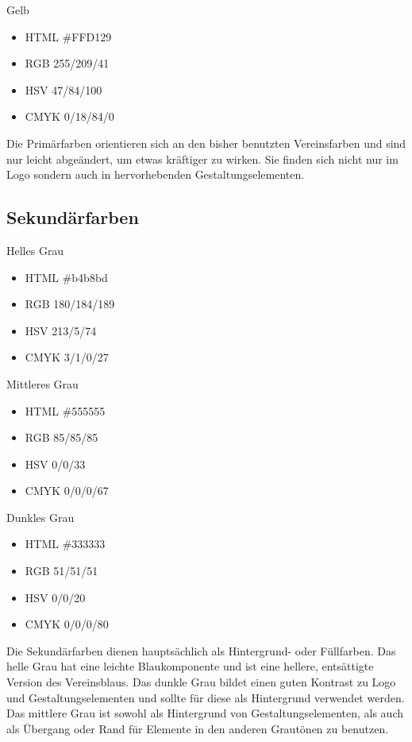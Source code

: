 \documentclass{article}
\begin{document}
\begin{samepage}
\cfield[LESYellow]
Gelb
\begin{itemize}
\item HTML \#FFD129
\item RGB 255/209/41
\item HSV 47/84/100
\item CMYK 0/18/84/0
\end{itemize}
\end{samepage}

Die Primärfarben orientieren sich an den bisher benutzten Vereinsfarben und sind nur leicht abgeändert, um etwas kräftiger zu wirken. Sie finden sich nicht nur im Logo sondern auch in hervorhebenden Gestaltungselementen.

\subsection{Sekundärfarben}
\begin{samepage}
\cfield[SECLight]
Helles Grau
\begin{itemize}
\item HTML \#b4b8bd
\item RGB 180/184/189
\item HSV 213/5/74
\item CMYK 3/1/0/27
\end{itemize}
\end{samepage}

\begin{samepage}
\cfield[SECMedium]
Mittleres Grau
\begin{itemize}
\item HTML \#555555
\item RGB 85/85/85
\item HSV 0/0/33
\item CMYK 0/0/0/67
\end{itemize}
\end{samepage}

\begin{samepage}
\cfield[SECDark]
Dunkles Grau
\begin{itemize}
\item HTML \#333333
\item RGB 51/51/51
\item HSV 0/0/20
\item CMYK 0/0/0/80
\end{itemize}
\end{samepage}

Die Sekundärfarben dienen hauptsächlich als Hintergrund- oder Füllfarben. Das helle Grau hat eine leichte Blaukomponente und ist eine hellere, entsättigte Version des Vereinsblaus. Das dunkle Grau bildet einen guten Kontrast zu Logo und Gestaltungselementen und sollte für diese als Hintergrund verwendet werden. Das mittlere Grau ist sowohl als Hintergrund von Gestaltungselementen, als auch als Übergang oder Rand für Elemente in den anderen Grautönen zu benutzen.
\end{document}
